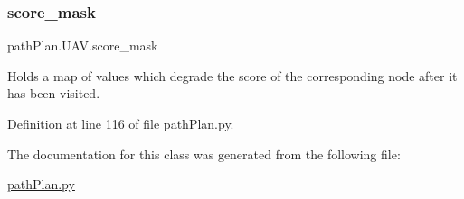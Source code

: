\subsubsection{\texorpdfstring{score\+\_\+mask}{score\_mask}}
{\footnotesize\ttfamily path\+Plan.\+U\+A\+V.\+score\+\_\+mask}



Holds a map of values which degrade the score of the corresponding node after it has been visited. 



Definition at line 116 of file path\+Plan.\+py.



The documentation for this class was generated from the following file\+:\begin{DoxyCompactItemize}
\item 
\mbox{\hyperlink{path_plan_8py}{path\+Plan.\+py}}\end{DoxyCompactItemize}
